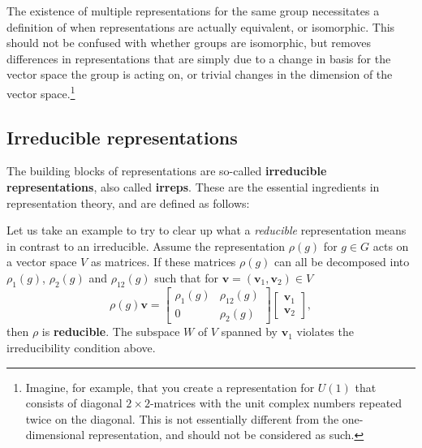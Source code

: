 \documentclass[notes.tex]{subfiles}
\begin{document}
The existence of multiple representations for the same group necessitates a definition of when representations are actually equivalent, or isomorphic. This should not be confused with whether groups are isomorphic, but removes differences in representations that are simply due to a change in basis for the vector space the group is acting on, or trivial changes in the dimension of the vector space.\footnote{Imagine, for example, that you create a representation for $U(1)$ that consists of diagonal $2\times2$-matrices with the unit complex numbers repeated twice on the diagonal. This is not essentially different from the one-dimensional representation, and should not be considered as such.}


\subsection{Irreducible representations}
\label{sec:irreps}
The building blocks of representations are so-called {\bf irreducible representations}, also called {\bf irreps}. These are the essential ingredients in representation theory, and are defined as follows: 

Let us take an example to try to clear up what a {\it reducible} representation means in contrast to an irreducible. Assume the representation $\rho(g)$ for $g \in G$ acts on a vector space $V$ as matrices. If these matrices $\rho(g)$ can all be decomposed into $\rho_1(g)$, $\rho_2(g)$ and $\rho_{12}(g)$ such that for $\mathbf v =(\mathbf v_1, \mathbf v_2)\in V$ 
\[\rho(g) \mathbf v = \begin{bmatrix}\rho_1(g) & \rho_{12}(g) \\ 0 & \rho_2(g)\end{bmatrix} \begin{bmatrix}\mathbf v_1 \\ \mathbf v_2 \end{bmatrix}  ,\]
then $\rho$ is {\bf reducible}. The subspace $W$ of $V$ spanned by $\mathbf v_1$ violates the irreducibility condition above.
\end{document}
